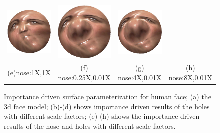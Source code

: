 \documentclass[runningheads]{llncs}
\begin{document}
{\begin{figure}[!htbp]
\begin{tabular}{cccc}
\includegraphics[height=0.25\textwidth]{./figs/roi_face/face_f.jpg}&
\includegraphics[height=0.25\textwidth]{./figs/roi_face/face_g.jpg}&
\includegraphics[height=0.25\textwidth]{./figs/roi_face/face_h.jpg}\\
(e)nose:1X,1X &(f) nose:0.25X,0.01X&(g) nose:4X,0.01X&(h) nose:8X,0.01X\\
\end{tabular}
   \caption{Importance driven surface parameterization for human face; (a) the 3d face model; (b)-(d) shows importance driven results of the holes with different scale factors; (e)-(h) shows the importance driven results of the nose and holes with different scale factors.}
  \label{fig:roi_face}
\end{figure}
}
\end{document}
